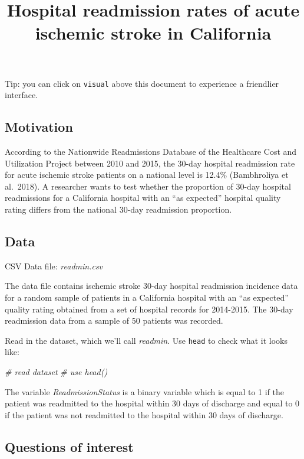 \documentclass[
]{article}
\title{Hospital readmission rates of acute ischemic stroke in
California}
\author{}
\date{\vspace{-2.5em}}
\newenvironment{Shaded}{\begin{snugshade}}{\end{snugshade}}
\newcommand{\CommentTok}[1]{\textcolor[rgb]{0.56,0.35,0.01}{\textit{#1}}}
\begin{document}
\maketitle

Tip: you can click on \texttt{visual} above this document to experience
a friendlier interface.

\hypertarget{motivation}{%
\subsection{Motivation}\label{motivation}}

According to the Nationwide Readmissions Database of the Healthcare Cost
and Utilization Project between 2010 and 2015, the 30-day hospital
readmission rate for acute ischemic stroke patients on a national level
is 12.4\% (Bambhroliya et al.~2018). A researcher wants to test whether
the proportion of 30-day hospital readmissions for a California hospital
with an ``as expected'' hospital quality rating differs from the
national 30-day readmission proportion.

\hypertarget{data}{%
\subsection{Data}\label{data}}

CSV Data file: \emph{readmin.csv}

The data file contains ischemic stroke 30-day hospital readmission
incidence data for a random sample of patients in a California hospital
with an ``as expected'' quality rating obtained from a set of hospital
records for 2014-2015. The 30-day readmission data from a sample of 50
patients was recorded.

Read in the dataset, which we'll call \emph{readmin}. Use \texttt{head}
to check what it looks like:

\begin{Shaded}
\begin{Highlighting}[]
\CommentTok{\# read dataset}
\CommentTok{\# use head()}
\end{Highlighting}
\end{Shaded}

The variable \emph{ReadmissionStatus} is a binary variable which is
equal to 1 if the patient was readmitted to the hospital within 30 days
of discharge and equal to 0 if the patient was not readmitted to the
hospital within 30 days of discharge.

\hypertarget{questions-of-interest}{%
\subsection{Questions of interest}\label{questions-of-interest}}
\end{document}

